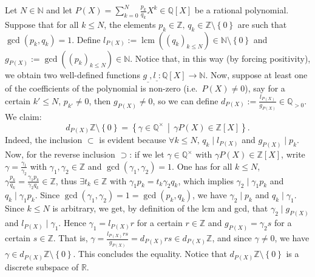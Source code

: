 \begin{solution}
    Let \( N \in \mathbb{N} \) and let \( P\left(X\right) = \sum_{k=0}^{N} \frac{p_k}{q_k} X^{k} \in \mathbb{Q}\left[X\right] \) be a rational polynomial. Suppose that for all \( k \leq N \), the elements \( p_k \in \mathbb{Z},\, q_k \in \mathbb{Z} \setminus \left\{ 0 \right\} \) are such that \( \gcd\left(p_k, q_k\right) = 1 \). Define \( l_{P\left(X\right)} := \operatorname{lcm}\left( \left( q_k \right)_{k \leq N} \right) \in \mathbb{N} \setminus \left\{ 0 \right\} \) and \( g_{P\left(X\right)} := \gcd\left( \left( p_k \right)_{k \leq N} \right) \in \mathbb{N} \). Notice that, in this way (by forcing positivity), we obtain two well-defined functions \( g_{\_}, l_{\_} : \mathbb{Q}\left[X\right] \rightarrow \mathbb{N} \). Now, suppose at least one of the coefficients of the polynomial is non-zero (i.e.\ \( P\left(X\right)\neq 0 \)), say for a certain \( k' \leq N \), \( p_{k'} \neq 0 \), then \( g_{P\left(X\right)} \neq 0 \), so we can define \( d_{P\left(X\right)} := \frac{l_{P\left(X\right)}}{g_{P\left(X\right)}} \in \mathbb{Q}_{>0} \). We claim:
    \begin{equation}
        \tag{1} \label{5.1} d_{P\left(X\right)} \mathbb{Z} \setminus \left\{ 0 \right\} = \left\{ \gamma \in \mathbb{Q}^{\times} \,\middle|\, \gamma P\left(X\right) \in \mathbb{Z}\left[X\right] \right\}.
    \end{equation}
    Indeed, the inclusion \( \subset \) is evident because \( \forall k \leq N,\, q_k \mid l_{P\left(X\right)} \) and \( g_{P\left(X\right)} \mid p_k \). Now, for the reverse inclusion \( \supset \): if we let \( \gamma \in \mathbb{Q}^{\times} \) with \( \gamma P\left(X\right) \in \mathbb{Z}\left[X\right] \), write \( \gamma = \frac{\gamma_1}{\gamma_2} \) with \( \gamma_1, \gamma_2 \in \mathbb{Z} \) and \( \gcd\left(\gamma_1, \gamma_2\right) = 1 \). One has for all \( k \leq N \), \( \gamma \frac{p_k}{q_k} = \frac{\gamma_1 p_k}{\gamma_2 q_k} \in \mathbb{Z} \), thus \( \exists t_k \in \mathbb{Z} \) with \( \gamma_1 p_k = t_k \gamma_2 q_k \), which implies \( \gamma_2 \mid \gamma_1 p_k \) and \( q_k \mid \gamma_1 p_k \). Since \( \gcd\left(\gamma_1, \gamma_2\right) = 1 = \gcd\left(p_k, q_k\right) \), we have \( \gamma_2 \mid p_k \) and \( q_k \mid \gamma_1 \). Since \( k \leq N \) is arbitrary, we get, by definition of the lcm and gcd, that \( \gamma_2 \mid g_{P\left(X\right)} \) and \( l_{P\left(X\right)} \mid \gamma_1 \). Hence \( \gamma_1 = l_{P\left(X\right)} r \) for a certain \( r \in \mathbb{Z} \) and \( g_{P\left(X\right)} = \gamma_2 s \) for a certain \( s \in \mathbb{Z} \). That is, \( \gamma = \frac{l_{P\left(X\right)} r s}{g_{P\left(X\right)}} = d_{P\left(X\right)} r s \in d_{P\left(X\right)} \mathbb{Z} \), and since \( \gamma \neq 0 \), we have \( \gamma \in d_{P\left(X\right)} \mathbb{Z} \setminus \left\{ 0 \right\} \). This concludes the equality. Notice that \( d_{P\left(X\right)} \mathbb{Z} \setminus \left\{ 0 \right\} \) is a discrete subspace of \( \mathbb{R} \).

\end{solution}
